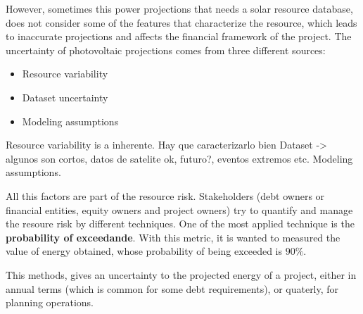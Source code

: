 
However, sometimes this power projections that needs a solar resource database, does not consider some of the features that characterize the resource, which leads to inaccurate projections and affects the financial framework of the project. The uncertainty of photovoltaic projections comes from three different sources: 

\begin{itemize}
 \item{Resource variability}
\item{Dataset uncertainty}
\item{Modeling assumptions}
\end{itemize}

Resource variability is a inherente. Hay que caracterizarlo bien
Dataset -> algunos son cortos, datos de satelite ok, futuro?, eventos extremos etc.
Modeling assumptions.

All this factors are part of the resource risk. Stakeholders (debt owners or financial entities, equity owners and project owners) try to quantify and manage the resoure risk by different techniques. One of the most applied technique is the \textbf{probability of exceedande}. With this metric, it is wanted to measured the value of energy obtained, whose probability of being exceeded is $90\%$.


This methods, gives an uncertainty to the projected energy of a project, either in annual terms (which is common for some debt requirements), or quaterly, for planning operations.

 

